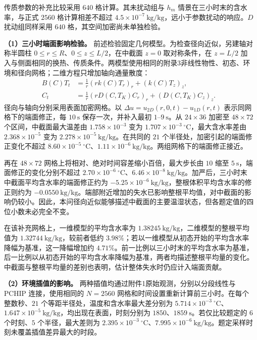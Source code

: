 \documentclass[UTF8,a4paper]{ctexart}
\begin{document}
传质参数的补充比较采用 \(640\) 格计算。其未扰动组与 \(h_m\) 情景在三小时末的含水率，与正式 \(2560\) 格计算相差不超过 \(4.5\times10^{-7}~\mathrm{kg/kg}\)，远小于参数扰动的响应。\(D\) 扰动组同样采用 \(640\) 格，其空间加密尚未单独检验。

\noindent\textbf{（1）三小时端面影响检验。}
前述检验固定几何模型。为检查径向近似，另建轴对称半圆柱 \(0\le r\le R\)、\(0\le z\le L/2\)，在中截面 \(z=0\) 取对称条件，在 \(z=L/2\) 加入与侧面相同的换热、传质条件。两模型使用相同的附录3非线性物性、初态、环境和径向网格；二维方程只增加轴向通量散度：
\begin{equation}
\begin{aligned}
B(C)T_t&=\frac1r(rk(C)T_r)_r+(k(C)T_z)_z,\\
C_t&=\frac1r(rD(C,T_K)C_r)_r+(D(C,T_K)C_z)_z.
\end{aligned}
\label{eq:q2-end-model}
\end{equation}
径向与轴向分别采用表面加密网格。以 \(\Delta u=u_{2D}(r,0,t)-u_{1D}(r,t)\) 表示同网格下的端面修正，每 \(10~\mathrm s\) 保存一次，并补入最初 \(1\)--\(9~\mathrm s\)。从 \(24\times36\) 加密至 \(48\times72\) 个区间，中截面最大温差由 \(1.758\times10^{-3}\) 变为 \(1.707\times10^{-3}~^\circ\mathrm C\)，最大含水率差由 \(2.368\times10^{-5}\) 变为 \(2.278\times10^{-5}~\mathrm{kg/kg}\)。在共同的 \(21\) 个半径处，加密引起的端面修正变化不超过 \(8.60\times10^{-5}~^\circ\mathrm C\)、\(1.11\times10^{-6}~\mathrm{kg/kg}\)。两组网格下的端面修正接近。

再在 \(48\times72\) 网格上将相对、绝对时间容差缩小百倍，最大步长由 \(10\) 缩至 \(5~\mathrm s\)，端面修正的变化分别不超过 \(2.70\times10^{-6}~^\circ\mathrm C\)、\(6.46\times10^{-8}~\mathrm{kg/kg}\)。加严后，三小时末中截面平均含水率的端面修正约为 \(-5.25\times10^{-6}~\mathrm{kg/kg}\)，整根体积平均含水率的修正则约为 \(-0.0550~\mathrm{kg/kg}\)。端部附近增加的失水已影响整根平均值，对中截面的影响仍较小。因此，本问径向近似能够描述中截面的主要温湿状态，但各题定值的四位小数未必完全不变。

在该补充网格上，一维模型的平均含水率为 \(1.38245~\mathrm{kg/kg}\)，二维模型的整根平均值为 \(1.32744~\mathrm{kg/kg}\)，较前者低约 \(3.98\%\)；若以一维模型从初态开始的平均含水率降幅为基准，这一降幅增加约 \(4.71\%\)。前一比例以三小时末的平均含水率为基准，后一比例以从初态开始的平均含水率降幅为基准，两者均描述整根平均量的变化。中截面与整根平均量的差别也表明，估计整体失水时仍应计入端面贡献。

\noindent\textbf{（2）环境插值的影响。}
两种插值均通过附件1原始观测，分别以分段线性与 PCHIP 连接，使用相同的 \(N=2560\) 网格和时间设置重新计算前三小时。在每个整数秒、\(21\) 个等距半径处，温度和含水率最大差分别为 \(5.714\times10^{-3}~^\circ\mathrm C\)、\(1.647\times10^{-5}~\mathrm{kg/kg}\)，均出现在表面，时刻分别为 \(1850\)、\(1859~\mathrm s\)。若仅比较题定的 \(6\) 个时刻、\(5\) 个半径，最大差则为 \(2.395\times10^{-3}~^\circ\mathrm C\)、\(7.995\times10^{-6}~\mathrm{kg/kg}\)。题定采样时刻未覆盖插值差异最大的时段。
\end{document}

